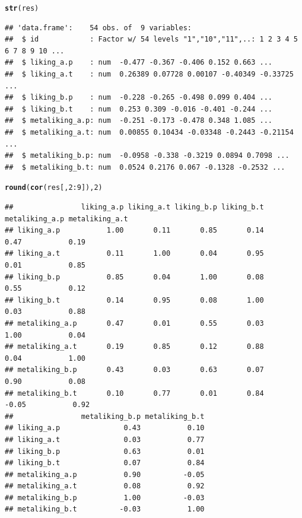 \documentclass[a4paper]{article}\usepackage[]{graphicx}\usepackage[]{color}
\makeatletter
\newcommand{\hlnum}[1]{\textcolor[rgb]{0.686,0.059,0.569}{#1}}%
\newcommand{\hlopt}[1]{\textcolor[rgb]{0,0,0}{#1}}%
\newcommand{\hlstd}[1]{\textcolor[rgb]{0.345,0.345,0.345}{#1}}%
\newcommand{\hlkwd}[1]{\textcolor[rgb]{0.737,0.353,0.396}{\textbf{#1}}}%
\newenvironment{kframe}{%
 \def\at@end@of@kframe{}%
 \ifinner\ifhmode%
  \def\at@end@of@kframe{\end{minipage}}%
  \begin{minipage}{\columnwidth}%
 \fi\fi%
 \def\FrameCommand##1{\hskip\@totalleftmargin \hskip-\fboxsep
 \colorbox{shadecolor}{##1}\hskip-\fboxsep
     \hskip-\linewidth \hskip-\@totalleftmargin \hskip\columnwidth}%
 \MakeFramed {\advance\hsize-\width
   \@totalleftmargin\z@ \linewidth\hsize
   \@setminipage}}%
 {\par\unskip\endMakeFramed%
 \at@end@of@kframe}
\newenvironment{knitrout}{}{} %
\makeatother
\begin{document}
\begin{knitrout}\small
{}\color{fgcolor}\begin{kframe}
\begin{alltt}
\hlkwd{str}\hlstd{(res)}
\end{alltt}
\begin{verbatim}
## 'data.frame':	54 obs. of  9 variables:
##  $ id            : Factor w/ 54 levels "1","10","11",..: 1 2 3 4 5 6 7 8 9 10 ...
##  $ liking_a.p    : num  -0.477 -0.367 -0.406 0.152 0.663 ...
##  $ liking_a.t    : num  0.26389 0.07728 0.00107 -0.40349 -0.33725 ...
##  $ liking_b.p    : num  -0.228 -0.265 -0.498 0.099 0.404 ...
##  $ liking_b.t    : num  0.253 0.309 -0.016 -0.401 -0.244 ...
##  $ metaliking_a.p: num  -0.251 -0.173 -0.478 0.348 1.085 ...
##  $ metaliking_a.t: num  0.00855 0.10434 -0.03348 -0.2443 -0.21154 ...
##  $ metaliking_b.p: num  -0.0958 -0.338 -0.3219 0.0894 0.7098 ...
##  $ metaliking_b.t: num  0.0524 0.2176 0.067 -0.1328 -0.2532 ...
\end{verbatim}
\begin{alltt}
\hlkwd{round}\hlstd{(}\hlkwd{cor}\hlstd{(res[,} \hlnum{2}\hlopt{:}\hlnum{9}\hlstd{]),} \hlnum{2}\hlstd{)}
\end{alltt}
\begin{verbatim}
##                liking_a.p liking_a.t liking_b.p liking_b.t metaliking_a.p metaliking_a.t
## liking_a.p           1.00       0.11       0.85       0.14           0.47           0.19
## liking_a.t           0.11       1.00       0.04       0.95           0.01           0.85
## liking_b.p           0.85       0.04       1.00       0.08           0.55           0.12
## liking_b.t           0.14       0.95       0.08       1.00           0.03           0.88
## metaliking_a.p       0.47       0.01       0.55       0.03           1.00           0.04
## metaliking_a.t       0.19       0.85       0.12       0.88           0.04           1.00
## metaliking_b.p       0.43       0.03       0.63       0.07           0.90           0.08
## metaliking_b.t       0.10       0.77       0.01       0.84          -0.05           0.92
##                metaliking_b.p metaliking_b.t
## liking_a.p               0.43           0.10
## liking_a.t               0.03           0.77
## liking_b.p               0.63           0.01
## liking_b.t               0.07           0.84
## metaliking_a.p           0.90          -0.05
## metaliking_a.t           0.08           0.92
## metaliking_b.p           1.00          -0.03
## metaliking_b.t          -0.03           1.00
\end{verbatim}
\end{kframe}
\end{knitrout}
\end{document}
